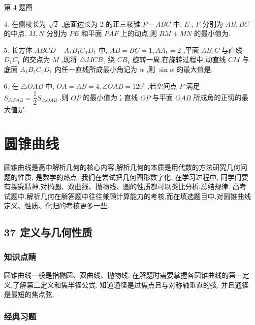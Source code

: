第 4 题图

4. 在侧棱长为 $\sqrt{2}$ ,底面边长为 2 的正三棱锥 $P - {ABC}$ 中, $E$ , $F$ 分别为 ${AB},{BC}$ 的中点, $M,N$ 分别为 ${PE}$ 和平面 ${PAF}$ 上的动点,则 ${BM} + {MN}$ 的最小值为\blkda{}.

5. 长方体 ${ABCD} - {A}_{1}{B}_{1}{C}_{1}{D}_{1}$ 中, ${AB} = {BC} = 1,A{A}_{1} = 2$ ,平面 $A{B}_{1}C$ 与直线 ${D}_{1}{C}_{1}$ 的交点为 $M$ ,现将 $\bigtriangleup {MC}{B}_{1}$ 绕 $C{B}_{1}$ 旋转一周,在旋转过程中,动直线 ${CM}$ 与底面 ${A}_{1}{B}_{1}{C}_{1}{D}_{1}$ 内任一直线所成最小角记为 $\alpha$ ,则 $\sin \alpha$ 的最大值是\blkda{}.

6. 在 $\bigtriangleup {OAB}$ 中, ${OA} = {AB} = 4,\angle {OAB} = {120}^{ \circ  }$ ,若空间点 $P$ 满足 ${S}_{\bigtriangleup {PAB}} = \dfrac{1}{2}{S}_{\bigtriangleup {OAB}}$ ,则 ${OP}$ 的最小值为\blkda{}；直线 ${OP}$ 与平面 ${OAB}$ 所成角的正切的最大值是\blkda{}.

\section*{圆锥曲线}

圆锥曲线是高中解析几何的核心内容,解析几何的本质是用代数的方法研究几何问题的性质, 是数学的热点, 我们在尝试把几何图形数字化. 在学习过程中, 同学们要有探究精神,对椭圆、双曲线、抛物线、圆的性质都可以类比分析,总结规律. 高考试题中,解析几何在解答题中往往兼顾计算能力的考核,而在填选题目中,对圆锥曲线定义、性质、化归的考核更多一些.

\subsection*{37 定义与几何性质}

\subsubsection*{知识点睛}

圆锥曲线一般是指椭圆、双曲线、抛物线. 在解题时需要掌握各圆锥曲线的第一定义,了解第二定义和焦半径公式. 知道通径是过焦点且与对称轴垂直的弦, 并且通径是最短的焦点弦.

\subsubsection*{经典习题}

